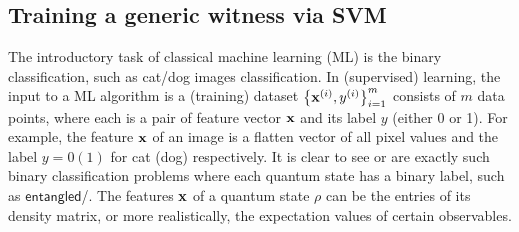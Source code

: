 \documentclass[
aps,
pra,
twocolumn,
floatfix,
]{revtex4-2}
\theoremstyle{plain}
\theoremstyle{definition}
\newcommand{\dm}{\rho}
\newcommand{\entangled}{\textsf{entangled}}
\begin{document}
\subsection{Training a generic witness via SVM}
The introductory task of classical machine learning (ML) is the binary classification,
such as cat/dog images classification. 
In (supervised) learning, the input to a ML algorithm is a (training) dataset $\qty{\vb{x}^{(i)},y^{(i)}}_{i=1}^m$ consists of $m$ data points, 
where each is a pair of feature vector $\vb{x}$ and its label $y$ (either 0 or 1).
For example, the feature $\vb{x}$ of an image is a flatten vector of all pixel values and the label $y=0(1)$ for \textsf{cat} (\textsf{dog}) respectively.
It is clear to see  or  are exactly such binary classification problems where each quantum state has a binary label, such as  $\entangled$/\textsf{}.
The features $\vb{x}$ of a quantum state $\dm$ can be the entries of its density matrix, or more realistically, the expectation values of certain observables.
\end{document}
